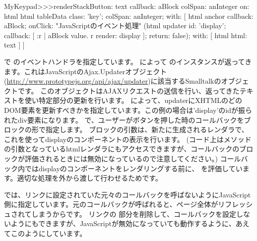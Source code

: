 \documentclass[a4paper,10pt,twoside]{book}
\begin{document}

\begin{code}{}
MyKeypad>>>renderStackButton: text callback: aBlock colSpan: anInteger on: html 
	html tableData
		class: 'key';
		colSpan: anInteger;
		with: [
			html anchor
				callback: aBlock;
				onClick:				"JavaScriptのイベント処理"
					(html updater
						id: 'display';
						callback: [ :r |
							aBlock value.
							r render: display ];
						return: false);
				with: [ html html: text ] ]
\end{code}

で のイベントハンドラを指定しています。
 によって のインスタンスが返ってきます。これはJavaScriptのAjax.Updaterオブジェクト(\url{http://www.prototypejs.org/api/ajax/updater})に該当するSmalltalkのオブジェクトです。
このオブジェクトはAJAXリクエストの送信を行い、返ってきたテキストを使い特定部分の更新を行います。
 によって、updaterにXHTMLのどのDOM要素を更新すべきかを指定しています。この例の場合は'display'のidが振られたdiv要素になります。
 で、ユーザーがボタンを押した時のコールバックをブロックの形で指定します。
ブロックの引数は、新たに生成されるレンダラで、これを使ってdisplayのコンポーネントの表示を行います。
(コード上はメソッドの引数となっているhtmlレンダラにもアクセスできますが、コールバックのブロックが評価されるときには無効になっているので注意してください。)
コールバック内ではdisplayのコンポーネントをレンダリングする前に、 を評価しています。適切な処理を外から渡して行わせるためです。

 では、リンクに設定されていた元々のコールバックを呼ばないようにJavaScript側に指定しています。元のコールバックが呼ばれると、ページ全体がリフレッシュされてしまうからです。
リンクの 部分を削除して、コールバックを設定しないようにもできますが、JavaScriptが無効になっていても動作するように、あえてこのようにしています。

\end{document}
